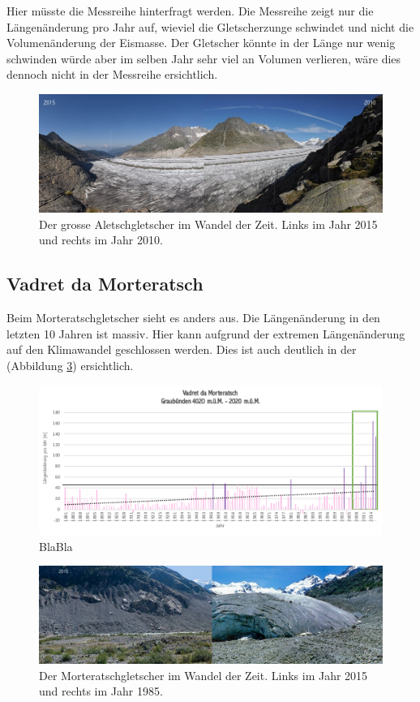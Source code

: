 \begin{refsection}
Hier müsste die Messreihe hinterfragt werden. Die Messreihe zeigt nur die Längenänderung pro Jahr auf, wieviel die Gletscherzunge schwindet und nicht die Volumenänderung der Eismasse. Der Gletscher könnte in der Länge nur wenig schwinden würde aber im selben Jahr sehr viel an Volumen verlieren, wäre dies dennoch nicht in der Messreihe ersichtlich.

\begin{figure}
\centering
\includegraphics[width=1.0\textwidth]{extrem/Aletsch.jpg}
\caption{Der grosse Aletschgletscher im Wandel der Zeit. Links im Jahr 2015 und rechts im Jahr 2010.}
\label{Aletsch}
\end{figure}


\subsection{Vadret da Morteratsch}
Beim Morteratschgletscher sieht es anders aus. Die Längenänderung in den letzten 10 Jahren ist massiv. Hier kann aufgrund der extremen Längenänderung auf den Klimawandel geschlossen werden. Dies ist auch deutlich in der (Abbildung \ref{Morteratsch}) ersichtlich.


\begin{figure}
\centering
\includegraphics[width=1.0\textwidth]{extrem/Morteratsch.pdf}
\caption{BlaBla}
\label{Morteratschtab}
\end{figure}


\begin{figure}
\centering
\includegraphics[width=1.0\textwidth]{extrem/Morteratsch.jpg}
\caption{Der Morteratschgletscher im Wandel der Zeit. Links im Jahr 2015 und rechts im Jahr 1985.}
\label{Morteratsch}
\end{figure}




\end{refsection}
